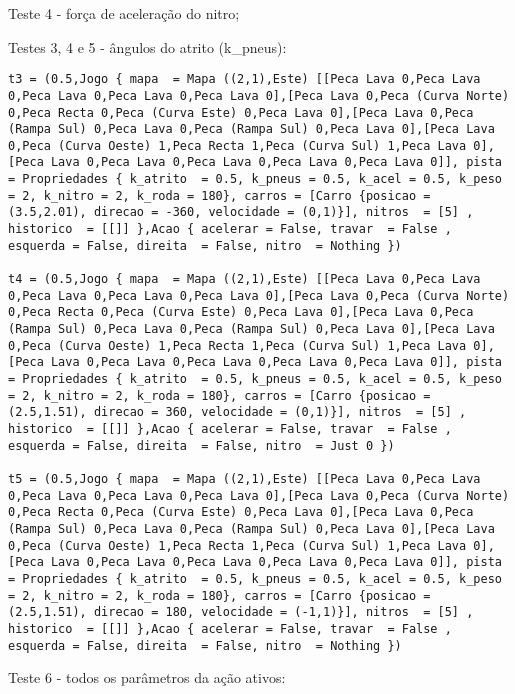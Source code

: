 \documentclass[a4paper]{report}
\begin{document}
Teste 4 - força de aceleração do nitro;

Testes 3, 4 e 5 - ângulos do atrito (k\_pneus):

\begin{lstlisting}
t3 = (0.5,Jogo { mapa  = Mapa ((2,1),Este) [[Peca Lava 0,Peca Lava 0,Peca Lava 0,Peca Lava 0,Peca Lava 0],[Peca Lava 0,Peca (Curva Norte) 0,Peca Recta 0,Peca (Curva Este) 0,Peca Lava 0],[Peca Lava 0,Peca (Rampa Sul) 0,Peca Lava 0,Peca (Rampa Sul) 0,Peca Lava 0],[Peca Lava 0,Peca (Curva Oeste) 1,Peca Recta 1,Peca (Curva Sul) 1,Peca Lava 0],[Peca Lava 0,Peca Lava 0,Peca Lava 0,Peca Lava 0,Peca Lava 0]], pista = Propriedades { k_atrito  = 0.5, k_pneus = 0.5, k_acel = 0.5, k_peso = 2, k_nitro = 2, k_roda = 180}, carros = [Carro {posicao = (3.5,2.01), direcao = -360, velocidade = (0,1)}], nitros  = [5] , historico  = [[]] },Acao { acelerar = False, travar  = False , esquerda = False, direita  = False, nitro  = Nothing })

t4 = (0.5,Jogo { mapa  = Mapa ((2,1),Este) [[Peca Lava 0,Peca Lava 0,Peca Lava 0,Peca Lava 0,Peca Lava 0],[Peca Lava 0,Peca (Curva Norte) 0,Peca Recta 0,Peca (Curva Este) 0,Peca Lava 0],[Peca Lava 0,Peca (Rampa Sul) 0,Peca Lava 0,Peca (Rampa Sul) 0,Peca Lava 0],[Peca Lava 0,Peca (Curva Oeste) 1,Peca Recta 1,Peca (Curva Sul) 1,Peca Lava 0],[Peca Lava 0,Peca Lava 0,Peca Lava 0,Peca Lava 0,Peca Lava 0]], pista = Propriedades { k_atrito  = 0.5, k_pneus = 0.5, k_acel = 0.5, k_peso = 2, k_nitro = 2, k_roda = 180}, carros = [Carro {posicao = (2.5,1.51), direcao = 360, velocidade = (0,1)}], nitros  = [5] , historico  = [[]] },Acao { acelerar = False, travar  = False , esquerda = False, direita  = False, nitro  = Just 0 })

t5 = (0.5,Jogo { mapa  = Mapa ((2,1),Este) [[Peca Lava 0,Peca Lava 0,Peca Lava 0,Peca Lava 0,Peca Lava 0],[Peca Lava 0,Peca (Curva Norte) 0,Peca Recta 0,Peca (Curva Este) 0,Peca Lava 0],[Peca Lava 0,Peca (Rampa Sul) 0,Peca Lava 0,Peca (Rampa Sul) 0,Peca Lava 0],[Peca Lava 0,Peca (Curva Oeste) 1,Peca Recta 1,Peca (Curva Sul) 1,Peca Lava 0],[Peca Lava 0,Peca Lava 0,Peca Lava 0,Peca Lava 0,Peca Lava 0]], pista = Propriedades { k_atrito  = 0.5, k_pneus = 0.5, k_acel = 0.5, k_peso = 2, k_nitro = 2, k_roda = 180}, carros = [Carro {posicao = (2.5,1.51), direcao = 180, velocidade = (-1,1)}], nitros  = [5] , historico  = [[]] },Acao { acelerar = False, travar  = False , esquerda = False, direita  = False, nitro  = Nothing })
\end{lstlisting}

Teste 6 - todos os parâmetros da ação ativos:
\end{document}

